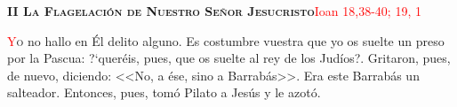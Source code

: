 \noindent\textbf{\textsc{II La Flagelación de Nuestro Señor Jesucristo}}\hfill\textcolor{red}{Ioan 18,38-40; 19, 1}

\vspace{0.25em}

\lettrine[lines=2, ante=\guillemotleft]{\textcolor{red}{Y}}o no hallo en Él delito alguno. Es costumbre vuestra que yo os suelte un preso por la Pascua: {?`}queréis, 
pues, que os suelte al rey de los Judíos?\guillemotright. Gritaron, pues, de nuevo, diciendo: <<No, a ése, sino a Barrabás>>. 
Era este Barrabás un salteador. Entonces, pues, tomó Pilato a Jesús y le azotó.